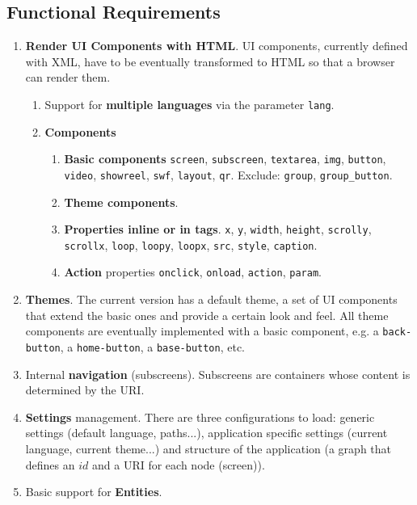 \subsection*{Functional Requirements}
\begin{enumerate}
    \item \textbf{Render \ac{UI} Components with \ac{HTML}}. \ac{UI} components, currently defined with \ac{XML}, have to be eventually transformed to \ac{HTML} so that a browser can render them.
    \begin{enumerate}
        \item Support for \textbf{multiple languages} via the parameter \texttt{lang}.
        \item \textbf{Components} 
        \begin{enumerate}
            \item \textbf{Basic components} \texttt{screen}, \texttt{subscreen}, \texttt{textarea}, \texttt{img}, \texttt{button}, \texttt{video}, \texttt{showreel}, \texttt{swf}, \texttt{layout}, \texttt{qr}.  Exclude: \texttt{group}, \texttt{group\_button}.
            \item \textbf{Theme components}.
            \item \textbf{Properties inline or in tags}. \texttt{x}, \texttt{y}, \texttt{width}, \texttt{height}, \texttt{scrolly}, \texttt{scrollx}, \texttt{loop}, \texttt{loopy}, \texttt{loopx}, \texttt{src}, \texttt{style}, \texttt{caption}.
            \item \textbf{Action} properties \texttt{onclick}, \texttt{onload}, \texttt{action}, \texttt{param}.
        \end{enumerate}
        
    \end{enumerate}
    \item \textbf{Themes}. The current version has a default theme, a set of \ac{UI} components that extend the basic ones and provide a certain look and feel. All theme components are eventually implemented with a basic component, e.g. a \texttt{back-button}, a \texttt{home-button}, a \texttt{base-button}, etc.
    \item Internal \textbf{navigation} (subscreens). Subscreens are containers whose content is determined by the \ac{URI}.
    \item \textbf{Settings} management. There are three configurations to load: generic settings (default language, paths...), application specific settings (current language, current theme...) and structure of the application (a graph that defines an $id$ and a \ac{URI} for each node (screen)).
    \item Basic support for \textbf{Entities}.
\end{enumerate}

